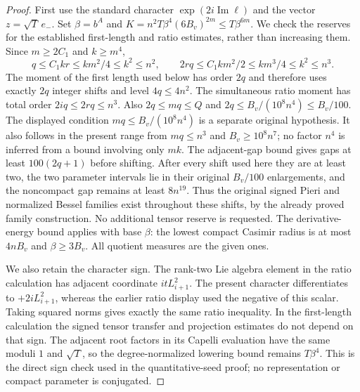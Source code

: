 \begin{proof}
First use the standard character
$\exp(2i\operatorname{Im}\ell)$ and the vector
$z=\sqrt T\,e_-$.  Set $\beta=b^A$ and
$K=n^2T\beta^4(6B_v)^{2m}\le T\beta^{6m}$.
We check the reserves for the established first-length and ratio
estimates, rather than increasing them.
Since $m\ge2C_1$ and $k\ge m^4$,
\[
 q\le C_1kr\le km^2/4\le k^2\le n^2,
 \qquad
 2rq\le C_1km^2/2\le km^3/4\le k^2\le n^3.
\]
The moment of the first length used below has order $2q$ and
therefore uses exactly $2q$ integer shifts and level $4q\le4n^2$.
The simultaneous ratio moment has total order $2iq\le2rq\le n^3$.
Also $2q\le mq\le Q$ and
$2q\le B_v/(10^8n^4)\le B_v/100$.
The displayed condition $mq\le B_v/(10^8n^4)$ is a separate
original hypothesis.  It also follows in the present range from
$mq\le n^3$ and $B_v\ge10^8n^7$; no factor $n^4$ is inferred
from a bound involving only $mk$.
The adjacent-gap bound gives gaps at least $100(2q+1)$
before shifting.  After every shift used here they are at least two,
the two parameter intervals lie in their original $B_v/100$
enlargements, and the noncompact gap remains at least
$8n^{19}$.  Thus the original signed Pieri and normalized Bessel
families exist throughout these shifts, by the already proved
family construction.  No additional tensor reserve is requested.
The derivative-energy bound applies with base $\beta$:
the lowest compact Casimir radius is at most $4nB_v$ and
$\beta\ge3B_v$.  All quotient measures are the given ones.
\cite{current-construction-record}

We also retain the character sign.  The rank-two Lie algebra
element in the ratio calculation has adjacent coordinate
$itL_{i+1}^2$.  The present character differentiates to
$+2iL_{i+1}^2$, whereas the earlier ratio display used the
negative of this scalar.  Taking squared norms gives exactly
the same ratio inequality.  In the first-length calculation
the signed tensor transfer and projection estimates do not
depend on that sign.  The adjacent root factors in its Capelli
evaluation have the same moduli $1$ and $\sqrt T$, so the
degree-normalized lowering bound remains $T\beta^4$.
This is the direct sign check used in the quantitative-seed
proof; no representation or compact parameter is conjugated.


\end{proof}
